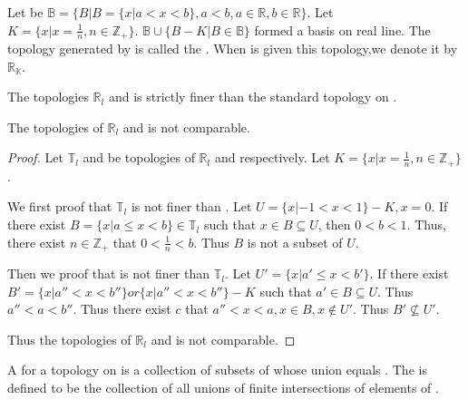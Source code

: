       \begin{definition}
            Let be $ \mathbb{B} = \{ B | B = \{ x | a < x < b \}, a < b, a \in \mathbb{R}, b \in \mathbb{R} \} $. Let $ K = \{ x | x = \frac{1}{n}, n \in \mathbb{Z_{+}} \} $. $ \mathbb{B} \cup \{ B - K | B \in \mathbb{B} \} $ formed a basis on real line. The topology generated by  is called the . When  is given this topology,we denote it by $ \mathbb{R_{K}} $.
      \end{definition}

      \begin{lemma} \omitObviuos
            The topologies $ \mathbb{R}_{l} $ and  is strictly finer than the standard topology on .
      \end{lemma}

      \begin{lemma}
            The topologies of $ \mathbb{R}_{l} $ and  is not comparable.
      \end{lemma}

      \begin{proof}
            Let $ \mathbb{T}_{l} $ and  be topologies of $ \mathbb{R}_{l} $ and  respectively. Let $ K = \{ x | x = \frac{1}{n}, n \in \mathbb{Z_{+}} \} $.

            We first proof that $ \mathbb{T}_{l} $ is not finer than . Let $ U = \{ x | -1 < x < 1 \} - K, x = 0 $.
            If there exist $ B = \{ x | a \le x < b \} \in \mathbb{T}_{l} $ such that $ x \in B \subseteq U $, then $ 0 < b < 1 $. Thus, there exist $ n \in \mathbb{Z_{+}} $ that $ 0 < \frac{1}{n} < b $. Thus $ B $ is not a subset of $ U $.

            Then we proof that  is not finer than $ \mathbb{T}_{l} $. Let $ U' = \{ x | a' \le x < b' \} $.
            If there exist $ B' = \{ x | a'' < x < b'' \} or \{ x | a'' < x < b'' \} - K $ such that $ {a'} \in B \subseteq U $.
            Thus $ a'' < a < b'' $.
            Thus there exist $ c $ that $ a'' < x < a, x \in B ,x \notin U' $. Thus $ B' \nsubseteq U' $.

            Thus the topologies of $ \mathbb{R}_{l} $ and  is not comparable.
      \end{proof}

      \begin{definition}[subbasis]
            A   for a topology on  is a collection of subsets of  whose union equals . The   is defined to be the collection   of all unions of finite intersections of elements of .
      \end{definition}
